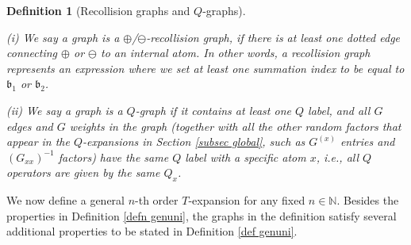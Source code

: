 \documentclass{article}
\newcommand{\1}{\mathds{1}}
\numberwithin{equation}{section}
\newcommand{\fb}{{\mathfrak b}}
\renewcommand{\cal}{\mathcal}
\newcommand{\N}{\mathbb{N}}
\theoremstyle{plain} %
\newtheorem{definition}[theorem]{Definition}
\theoremstyle{remark}
\begin{document}
\begin{definition}[Recollision graphs and $Q$-graphs]\label{Def_recoll}

(i) We say a graph is a $\oplus$/$\ominus$-recollision graph, if there is at least one dotted edge connecting $\oplus$ or $\ominus$ to an internal atom. In other words, a recollision graph represents an expression where we set at least one summation index to be equal to $\fb_1$ or $\fb_2$.

\medskip
\noindent(ii) We say a graph is a $Q$-graph if it contains at least one $Q$ label, and all  $G$ edges and $G$ weights  in the graph (together with all the other random factors that appear in the $Q$-expansions in Section \ref{subsec global}, such as $G^{(x)}$ entries and $(G_{xx})^{-1}$ factors) have the same $Q$ label with a specific atom $x$, i.e., all $Q$ operators are given by the same $Q_x$.



\end{definition}

 
We now  define a general $n$-th order $T$-expansion for any fixed $n\in \N$. Besides the properties in Definition \ref{defn genuni}, the graphs in the definition satisfy several additional properties to be stated in Definition \ref{def genuni}. 
\end{document}
